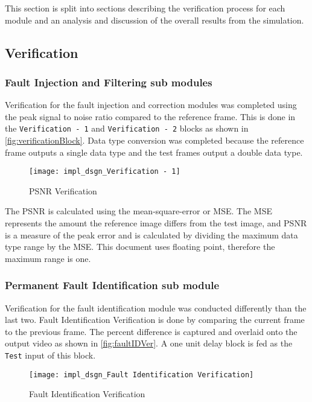 This section is split into sections describing the verification process for each module and an analysis and discussion of the overall results from the simulation.
\subsection{Verification}
\subsubsection{Fault Injection and Filtering sub modules}\label{sec:verifFaultInjectFilter}
\par Verification for the fault injection and correction modules was completed using the peak signal to noise ratio compared to the reference frame. This is done in the \verb!Verification - 1! and \verb!Verification - 2! blocks as shown in \autoref{fig:verificationBlock}. Data type conversion was completed because the reference frame outputs a single data type and the test frames output a double data type.
\begin{figure}[H]
    \texttt{[image: impl\_dsgn\_Verification - 1]}
    \caption{PSNR Verification}
    \label{fig:verificationBlock}
\end{figure}
\par The PSNR is calculated using the mean-square-error or MSE. The MSE represents the amount the reference image differs from the test image, and PSNR is a measure of the peak error and is calculated by dividing the maximum data type range by the MSE. This document uses floating point, therefore the maximum range is one\cite{mathworks}.
\subsubsection{Permanent Fault Identification sub module}\label{sec:permFaultID}
\par Verification for the fault identification module was conducted differently than the last two. Fault Identification Verification is done by comparing the current frame to the previous frame. The percent difference is captured and overlaid onto the output video as shown in \autoref{fig:faultIDVer}. A one unit delay block is fed as the \verb!Test! input of this block.
\begin{figure}[H]
    \texttt{[image: impl\_dsgn\_Fault Identification Verification]}
    \caption{Fault Identification Verification}
    \label{fig:faultIDVer}
\end{figure}

